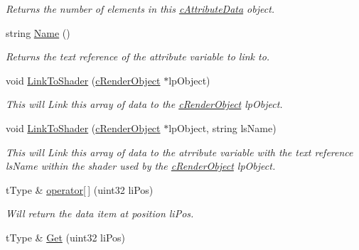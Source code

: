 \begin{DoxyCompactItemize}
\begin{DoxyCompactList}\small\item\em Returns the number of elements in this \hyperlink{classc_attribute_data}{cAttributeData} object. \end{DoxyCompactList}\item 
\hypertarget{classc_attribute_data_a1f45ce92d3a92cf94b1cc31d69e6b440}{
string \hyperlink{classc_attribute_data_a1f45ce92d3a92cf94b1cc31d69e6b440}{Name} ()}
\label{classc_attribute_data_a1f45ce92d3a92cf94b1cc31d69e6b440}

\begin{DoxyCompactList}\small\item\em Returns the text reference of the attribute variable to link to. \end{DoxyCompactList}\item 
\hypertarget{classc_attribute_data_a5e426850dafe2925d372d4e8fa7386df}{
void \hyperlink{classc_attribute_data_a5e426850dafe2925d372d4e8fa7386df}{LinkToShader} (\hyperlink{classc_render_object}{cRenderObject} $\ast$lpObject)}
\label{classc_attribute_data_a5e426850dafe2925d372d4e8fa7386df}

\begin{DoxyCompactList}\small\item\em This will Link this array of data to the \hyperlink{classc_render_object}{cRenderObject} lpObject. \end{DoxyCompactList}\item 
\hypertarget{classc_attribute_data_ad8e445c34d8450c383b9163303e7bfc4}{
void \hyperlink{classc_attribute_data_ad8e445c34d8450c383b9163303e7bfc4}{LinkToShader} (\hyperlink{classc_render_object}{cRenderObject} $\ast$lpObject, string lsName)}
\label{classc_attribute_data_ad8e445c34d8450c383b9163303e7bfc4}

\begin{DoxyCompactList}\small\item\em This will Link this array of data to the atrribute variable with the text reference lsName within the shader used by the \hyperlink{classc_render_object}{cRenderObject} lpObject. \end{DoxyCompactList}\item 
\hypertarget{classc_attribute_data_a59b992eac95556cc95ab855b1d3b9668}{
tType \& \hyperlink{classc_attribute_data_a59b992eac95556cc95ab855b1d3b9668}{operator\mbox{[}$\,$\mbox{]}} (uint32 liPos)}
\label{classc_attribute_data_a59b992eac95556cc95ab855b1d3b9668}

\begin{DoxyCompactList}\small\item\em Will return the data item at position liPos. \end{DoxyCompactList}\item 
\hypertarget{classc_attribute_data_a081ea5ae43b9d365a018b5a4386d8092}{
tType \& \hyperlink{classc_attribute_data_a081ea5ae43b9d365a018b5a4386d8092}{Get} (uint32 liPos)}
\label{classc_attribute_data_a081ea5ae43b9d365a018b5a4386d8092}


\end{DoxyCompactItemize}
